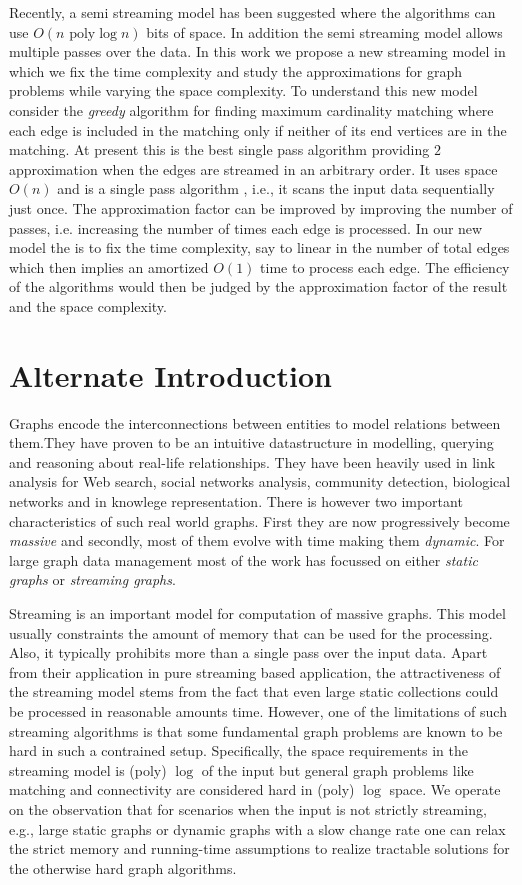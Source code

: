 \documentclass{scrartcl}
\begin{document}
Recently, a semi streaming model has been suggested where the algorithms can use $O(n \text{ poly} \log n)$ bits of space. In addition the semi streaming model allows multiple passes over the data.  In this work we propose a new streaming model in which we fix the time complexity and study the approximations for graph problems while varying the space complexity. To understand this new model consider the \emph{greedy} algorithm for finding maximum cardinality matching where each edge is included in the matching only if neither of its end vertices are in the matching. At present this is the best single pass algorithm providing $2$ approximation when the edges are streamed in an arbitrary order. It uses space $O(n)$ and is a single pass algorithm , i.e., it scans the input data sequentially just once. The approximation factor can be improved by improving the number of passes, i.e. increasing the number of times each edge is processed. In our new model the is to fix the time complexity, say to linear in the number of total edges which then implies an amortized $O(1)$ time to process each edge. The efficiency of the algorithms would then be judged by the approximation factor of the result and the space complexity.  


\section{Alternate Introduction}
Graphs encode the interconnections between entities to model relations between them.They have proven to be an intuitive datastructure in modelling, querying and reasoning about real-life relationships. They have been heavily used in link analysis for Web search, social networks analysis, community detection, biological networks and in knowlege representation. There is however two important characteristics of such real world graphs. First they are now progressively become \emph{massive} and secondly, most of them evolve with time making them \emph{dynamic}. For large graph data management most of the work has focussed on either \emph{static graphs} or \emph{streaming graphs}.

Streaming is an important model for computation of massive graphs. This model usually constraints the amount of memory that can be used for the processing. Also, it typically prohibits more than a single pass over the input data. Apart from their application in pure streaming based application, the attractiveness of the streaming model stems from the fact that even large static collections could be processed in reasonable amounts time. However, one of the limitations of such streaming algorithms is that some fundamental graph problems are known to be hard in such a contrained setup. Specifically, the space requirements in the streaming model is (poly) $\log$ of the input but general graph problems like matching and connectivity are considered hard in (poly) $\log$ space. We operate on the observation that for scenarios when the input is not strictly streaming, e.g., large static graphs or dynamic graphs with a slow change rate one can relax the strict memory and running-time assumptions to realize tractable solutions for the otherwise hard graph algorithms.
\end{document}
